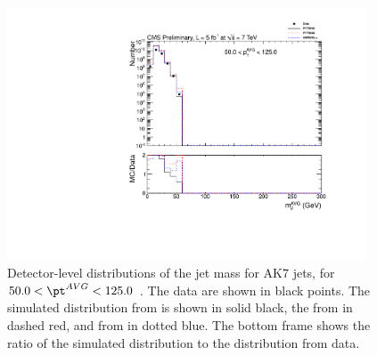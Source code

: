 \clearpage


\fi


\ifnpas 

\begin{figure}[htbp]
\centering
\includegraphics[width=0.95\textwidth]{figs/histAK7MjetVsPtAvg_rawDataMCComparisons_pt_1}
\caption{Detector-level distributions of the jet mass for AK7 jets,
for $50.0 < \pt^{AVG} < 125.0$ \GeVc. The data are shown in black points.
The simulated distribution from \PYTHIA is shown in solid black, 
the from \PYTHIAEIGHT in dashed red, and from \HERWIG in dotted blue. 
The bottom frame shows the ratio of the simulated distribution
to the distribution from data. 
\label{figs:histAK7MjetVsPtAvg_rawDataMCComparisons_pt_1}}
\end{figure}
\fi


